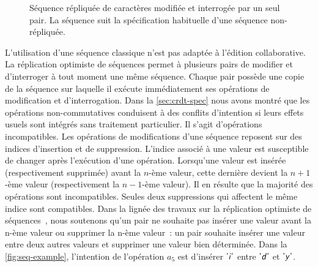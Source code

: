 \begin{figure}[htb]
    \newcommand*\hsep{1.2}
    \centering
    \caption[Séquence répliquée de caractères modifiée et interrogée par un seul pair]{Séquence répliquée de caractères modifiée et interrogée par un seul pair.
    La séquence suit la spécification habituelle d'une séquence non-répliquée.}\label{fig:seq-example}
\end{figure}

L'utilisation d'une séquence classique n'est pas adaptée à l'édition collaborative.
La réplication optimiste de séquences permet à plusieurs pairs de modifier et d'interroger à tout moment une même séquence.
Chaque pair possède une copie de la séquence sur laquelle il exécute immédiatement ses opérations de modification et d'interrogation.
Dans la \autoref{sec:crdt-spec} nous avons montré que les opérations non-commutatives conduisent à des conflits d'intention si leurs effets usuels sont intégrés sans traitement particulier.
Il s'agit d'opérations incompatibles.
Les opérations de modifications d'une séquence reposent sur des indices d'insertion et de suppression.
L'indice associé à une valeur est susceptible de changer après l'exécution d'une opération.
Lorsqu'une valeur est insérée (respectivement supprimée) avant la $n$-ème valeur, cette dernière devient la $n+1$-ème valeur (respectivement la $n-1$-ème valeur).
Il en résulte que la majorité des opérations sont incompatibles.
Seules deux suppressions qui affectent le même indice sont compatibles.
Dans la lignée des travaux sur la réplication optimiste de séquences~\autocite{oster_2006_woot,sun_1998_cci}, nous soutenons qu'un pair ne souhaite pas insérer une valeur avant la n-ème valeur ou supprimer la n-ème valeur~:
un pair souhaite insérer une valeur entre deux autres valeurs et supprimer une valeur bien déterminée.
Dans la \autoref{fig:seq-example}, l'intention de l'opération $a_5$ est d'insérer $\textsf{'\textit{i}'}$ entre $\textsf{'\textit{d}'}$ et $\textsf{'\textit{y}'}$.

